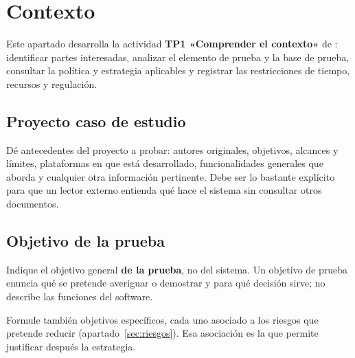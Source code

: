 \section{Contexto}

\begin{notanormativa}
Este apartado desarrolla la actividad \textbf{TP1 «Comprender el contexto»} de :
identificar partes interesadas, analizar el elemento de prueba y la base de prueba, consultar
la política y estrategia aplicables y registrar las restricciones de tiempo, recursos y
regulación.
\end{notanormativa}

\subsection{Proyecto caso de estudio}

\begin{instruccion}
Dé antecedentes del proyecto a probar: autores originales, objetivos, alcances y límites,
plataformas en que está desarrollado, funcionalidades generales que aborda y cualquier otra
información pertinente. Debe ser lo bastante explícito para que un lector externo entienda
qué hace el sistema sin consultar otros documentos.
\end{instruccion}


\subsection{Objetivo de la prueba}

\begin{instruccion}
Indique el objetivo general \textbf{de la prueba}, no del sistema. Un objetivo de prueba
enuncia qué se pretende averiguar o demostrar y para qué decisión sirve; no describe las
funciones del software.

Formule también objetivos específicos, cada uno asociado a los riesgos que pretende reducir
(apartado~\ref{sec:riesgos}). Esa asociación es la que permite justificar después la estrategia.
\end{instruccion}


